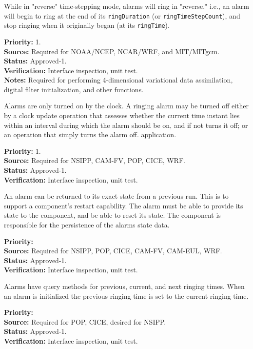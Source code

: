 While in "reverse" time-stepping mode, alarms will ring in "reverse," i.e., an alarm will begin to ring at the end of its {\tt ringDuration} (or {\tt ringTimeStepCount}), and stop ringing when it originally began (at its {\tt ringTime}).
\begin{reqlist}
{\bf Priority:} 1. \\
{\bf Source:} Required for NOAA/NCEP, NCAR/WRF, and MIT/MITgcm. \\
{\bf Status:} Approved-1. \\
{\bf Verification:} Interface inspection, unit test. \\
{\bf Notes:} Required for performing 4-dimensional variational data assimilation, digital filter initialization, and other functions.
\end{reqlist}

Alarms are only turned on by the clock.  A ringing alarm may be turned off 
either by a clock update operation that assesses whether the current time instant
lies within an interval during which the alarm should be on, and if not turns it off; 
or an operation that simply turns the alarm off. 
application.
\begin{reqlist}
{\bf Priority:} 1. \\
{\bf Source:} Required for NSIPP, CAM-FV, POP, CICE, WRF. \\
{\bf Status:} Approved-1. \\
{\bf Verification:} Interface inspection, unit test.  
\end{reqlist}

An alarm can be returned to its exact state from a previous run.
This is to support a component's restart capability.  The alarm must be
able to provide its state to the component, and be able to reset its state.
The component is responsible for the persistence of the alarms state data.
\begin{reqlist}
{\bf Priority:} \\
{\bf Source:} Required for NSIPP, POP, CICE, CAM-FV, CAM-EUL, WRF. \\
{\bf Status:} Approved-1. \\
{\bf Verification:} Interface inspection, unit test.  
\end{reqlist}

Alarms have query methods for previous, current, and next ringing times.
When an alarm is initialized the previous ringing time is set to the current ringing time.
\begin{reqlist}
{\bf Priority:} \\
{\bf Source:} Required for POP, CICE, desired for NSIPP. \\
{\bf Status:} Approved-1. \\
{\bf Verification:} Interface inspection, unit test.  
\end{reqlist}

